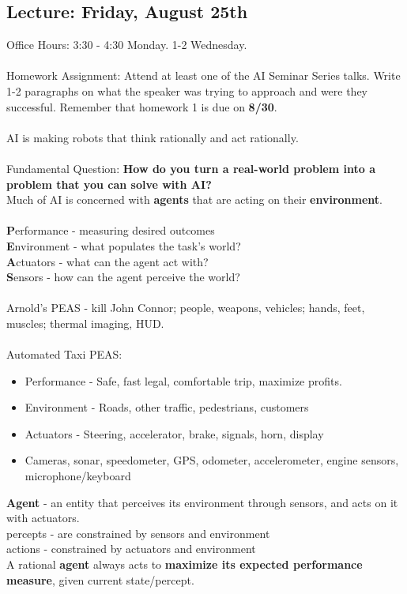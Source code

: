 \documentclass[10pt]{article}
\theoremstyle{plain}
\begin{document}
\maketitle

\subsection*{Lecture: Friday, August 25th}

Office Hours: 3:30 - 4:30 Monday. 1-2 Wednesday. \\\\
Homework Assignment: Attend at least one of the AI Seminar Series talks. Write 1-2 paragraphs on what the speaker was trying to approach and were they successful. Remember that homework 1 is due on \textbf{8/30}. \\\\
AI is making robots that think rationally and act rationally. \\\\
Fundamental Question: \textbf{How do you turn a real-world problem into a problem that you can solve with AI?}\\
Much of AI is concerned with \textbf{agents} that are acting on their \textbf{environment}. \\\\
\textbf{P}erformance - measuring desired outcomes\\
\textbf{E}nvironment - what populates the task's world?\\
\textbf{A}ctuators - what can the agent act with?\\
\textbf{S}ensors - how can the agent perceive the world?\\\\
Arnold's PEAS - kill John Connor; people, weapons, vehicles; hands, feet, muscles; thermal imaging, HUD. \\\\
Automated Taxi PEAS: \\
\begin{itemize}
\item Performance - Safe, fast legal, comfortable trip, maximize profits. 
\item Environment - Roads, other traffic, pedestrians, customers
\item Actuators - Steering, accelerator, brake, signals, horn, display
\item Cameras, sonar, speedometer, GPS, odometer, accelerometer, engine sensors, microphone/keyboard
\end{itemize}
\textbf{Agent} - an entity that perceives its environment through sensors, and acts on it with actuators. \\
percepts - are constrained by sensors and environment\\
actions - constrained by actuators and environment\\
A rational \textbf{agent} always acts to \textbf{maximize its expected performance measure}, given current state/percept. 
\end{document}
